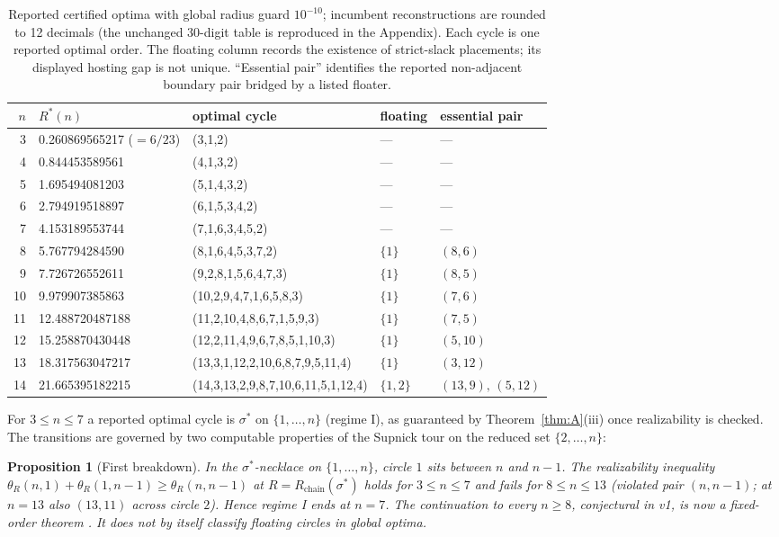 \documentclass[11pt]{article}
\newtheorem{proposition}[theorem]{Proposition}
\theoremstyle{definition}
\theoremstyle{remark}
\begin{document}
\begin{table}[ht]\centering
\caption{Reported certified optima with global radius guard $10^{-10}$; incumbent reconstructions are rounded to 12 decimals (the unchanged 30-digit table is reproduced in the Appendix). Each cycle is one reported optimal order. The floating column records the existence of strict-slack placements; its displayed hosting gap is not unique. ``Essential pair'' identifies the reported non-adjacent boundary pair bridged by a listed floater.}
\label{tab:main}
\small
\begin{tabular}{rllll}
\toprule
$n$ & $R^\ast(n)$ & optimal cycle & floating & essential pair \\
\midrule
3 & 0.260869565217 ($=6/23$) & (3,1,2) & --- & --- \\
4 & 0.844453589561 & (4,1,3,2) & --- & --- \\
5 & 1.695494081203 & (5,1,4,3,2) & --- & --- \\
6 & 2.794919518897 & (6,1,5,3,4,2) & --- & --- \\
7 & 4.153189553744 & (7,1,6,3,4,5,2) & --- & --- \\
8 & 5.767794284590 & (8,1,6,4,5,3,7,2) & $\{1\}$ & $(8,6)$ \\
9 & 7.726726552611 & (9,2,8,1,5,6,4,7,3) & $\{1\}$ & $(8,5)$ \\
10 & 9.979907385863 & (10,2,9,4,7,1,6,5,8,3) & $\{1\}$ & $(7,6)$ \\
11 & 12.488720487188 & (11,2,10,4,8,6,7,1,5,9,3) & $\{1\}$ & $(7,5)$ \\
12 & 15.258870430448 & (12,2,11,4,9,6,7,8,5,1,10,3) & $\{1\}$ & $(5,10)$ \\
13 & 18.317563047217 & (13,3,1,12,2,10,6,8,7,9,5,11,4) & $\{1\}$ & $(3,12)$ \\
14 & 21.665395182215 & (14,3,13,2,9,8,7,10,6,11,5,1,12,4) & $\{1,2\}$ & $(13,9),\,(5,12)$ \\
\bottomrule
\end{tabular}
\end{table}

For $3\le n\le7$ a reported optimal cycle is $\sigma^\ast$ on $\{1,\dots,n\}$ (regime I), as guaranteed by Theorem~\ref{thm:A}(iii) once realizability is checked. The transitions are governed by two computable properties of the Supnick tour on the reduced set $\{2,\dots,n\}$:

\begin{proposition}[First breakdown]\label{prop:break1}
In the $\sigma^\ast$-necklace on $\{1,\dots,n\}$, circle $1$ sits between $n$ and $n-1$. The realizability inequality
$\theta_R(n,1)+\theta_R(1,n-1)\ge\theta_R(n,n-1)$ at $R=R_{\mathrm{chain}}(\sigma^\ast)$
holds for $3\le n\le7$ and fails for $8\le n\le 13$ (violated pair $(n,n-1)$; at $n=13$ also $(13,11)$ across circle $2$). Hence regime I ends at $n=7$. The continuation to every $n\ge8$, conjectural in v1, is now a fixed-order theorem \cite{fixedseams}. It does not by itself classify floating circles in global optima.
\end{proposition}
\end{document}

